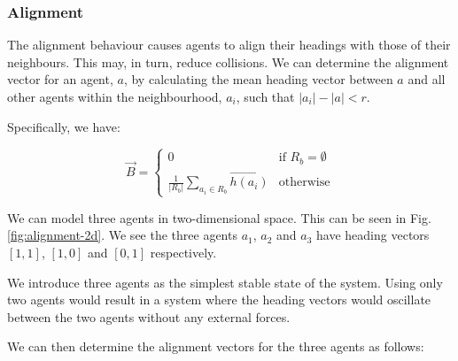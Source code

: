 \documentclass[12pt]{article}
\begin{document}
\subsubsection{Alignment}

The alignment behaviour causes agents to align their headings with those of their neighbours. This may, in turn, reduce collisions. We can determine the alignment vector for an agent, $a$, by calculating the mean heading vector between $a$ and all other agents within the neighbourhood, $a_i$, such that $|a_i| - |a| < r$.

Specifically, we have:

\begin{equation}
\vec{B} =
\begin{cases}
    0 & \text{if } R_b = \emptyset \\
    \frac{1}{|R_b|} \sum_{a_i \in R_b} \vec{h(a_i)} & \text{otherwise}
\end{cases}
\end{equation}

We can model three agents in two-dimensional space. This can be seen in Fig. \ref{fig:alignment-2d}. We see the three agents $a_1$, $a_2$ and $a_3$ have heading vectors $[1,1]$, $[1,0]$ and $[0,1]$ respectively.

We introduce three agents as the simplest stable state of the system. Using only two agents would result in a system where the heading vectors would oscillate between the two agents without any external forces.

We can then determine the alignment vectors for the three agents as follows:
\end{document}
